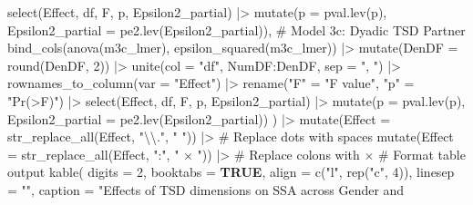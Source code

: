 \documentclass[
  bookmarksnumbered]{article}
\newenvironment{Shaded}{\begin{snugshade}}{\end{snugshade}}
\newcommand{\AttributeTok}[1]{\textcolor[rgb]{0.80,0.80,0.80}{#1}}
\newcommand{\CommentTok}[1]{\textcolor[rgb]{0.50,0.62,0.50}{#1}}
\newcommand{\ConstantTok}[1]{\textcolor[rgb]{0.86,0.64,0.64}{\textbf{#1}}}
\newcommand{\DecValTok}[1]{\textcolor[rgb]{0.86,0.86,0.80}{#1}}
\newcommand{\FunctionTok}[1]{\textcolor[rgb]{0.94,0.94,0.56}{#1}}
\newcommand{\NormalTok}[1]{\textcolor[rgb]{0.80,0.80,0.80}{#1}}
\newcommand{\OtherTok}[1]{\textcolor[rgb]{0.94,0.94,0.56}{#1}}
\newcommand{\SpecialCharTok}[1]{\textcolor[rgb]{0.86,0.64,0.64}{#1}}
\newcommand{\StringTok}[1]{\textcolor[rgb]{0.80,0.58,0.58}{#1}}
\begin{document}
\begin{Shaded}
\begin{Highlighting}[]
    \FunctionTok{select}\NormalTok{(Effect, df, F, p, Epsilon2\_partial) }\SpecialCharTok{|\textgreater{}}
    \FunctionTok{mutate}\NormalTok{(}\AttributeTok{p =} \FunctionTok{pval.lev}\NormalTok{(p), }\AttributeTok{Epsilon2\_partial =} \FunctionTok{pe2.lev}\NormalTok{(Epsilon2\_partial)),}
  \CommentTok{\# Model 3c: Dyadic TSD Partner}
  \FunctionTok{bind\_cols}\NormalTok{(}\FunctionTok{anova}\NormalTok{(m3c\_lmer), }\FunctionTok{epsilon\_squared}\NormalTok{(m3c\_lmer)) }\SpecialCharTok{|\textgreater{}}
    \FunctionTok{mutate}\NormalTok{(}\AttributeTok{DenDF =} \FunctionTok{round}\NormalTok{(DenDF, }\DecValTok{2}\NormalTok{)) }\SpecialCharTok{|\textgreater{}}
    \FunctionTok{unite}\NormalTok{(}\AttributeTok{col =} \StringTok{"df"}\NormalTok{, NumDF}\SpecialCharTok{:}\NormalTok{DenDF, }\AttributeTok{sep =} \StringTok{", "}\NormalTok{) }\SpecialCharTok{|\textgreater{}}
    \FunctionTok{rownames\_to\_column}\NormalTok{(}\AttributeTok{var =} \StringTok{"Effect"}\NormalTok{) }\SpecialCharTok{|\textgreater{}}
    \FunctionTok{rename}\NormalTok{(}\StringTok{"F"} \OtherTok{=} \StringTok{"F value"}\NormalTok{, }\StringTok{"p"} \OtherTok{=} \StringTok{"Pr(\textgreater{}F)"}\NormalTok{) }\SpecialCharTok{|\textgreater{}}
    \FunctionTok{select}\NormalTok{(Effect, df, F, p, Epsilon2\_partial) }\SpecialCharTok{|\textgreater{}}
    \FunctionTok{mutate}\NormalTok{(}\AttributeTok{p =} \FunctionTok{pval.lev}\NormalTok{(p), }\AttributeTok{Epsilon2\_partial =} \FunctionTok{pe2.lev}\NormalTok{(Epsilon2\_partial))}
\NormalTok{) }\SpecialCharTok{|\textgreater{}}
  \FunctionTok{mutate}\NormalTok{(}\AttributeTok{Effect =} \FunctionTok{str\_replace\_all}\NormalTok{(Effect, }\StringTok{"}\SpecialCharTok{\textbackslash{}\textbackslash{}}\StringTok{."}\NormalTok{, }\StringTok{" "}\NormalTok{)) }\SpecialCharTok{|\textgreater{}} \CommentTok{\# Replace dots with spaces}
  \FunctionTok{mutate}\NormalTok{(}\AttributeTok{Effect =} \FunctionTok{str\_replace\_all}\NormalTok{(Effect, }\StringTok{":"}\NormalTok{, }\StringTok{" × "}\NormalTok{)) }\SpecialCharTok{|\textgreater{}} \CommentTok{\# Replace colons with ×}
  \CommentTok{\# Format table output}
  \FunctionTok{kable}\NormalTok{(}
    \AttributeTok{digits =} \DecValTok{2}\NormalTok{, }\AttributeTok{booktabs =} \ConstantTok{TRUE}\NormalTok{, }\AttributeTok{align =} \FunctionTok{c}\NormalTok{(}\StringTok{"l"}\NormalTok{, }\FunctionTok{rep}\NormalTok{(}\StringTok{"c"}\NormalTok{, }\DecValTok{4}\NormalTok{)),}
    \AttributeTok{linesep =} \StringTok{""}\NormalTok{, }\AttributeTok{caption =} \StringTok{"Effects of TSD dimensions on SSA across Gender and }

\end{Highlighting}
\end{Shaded}
\end{document}
